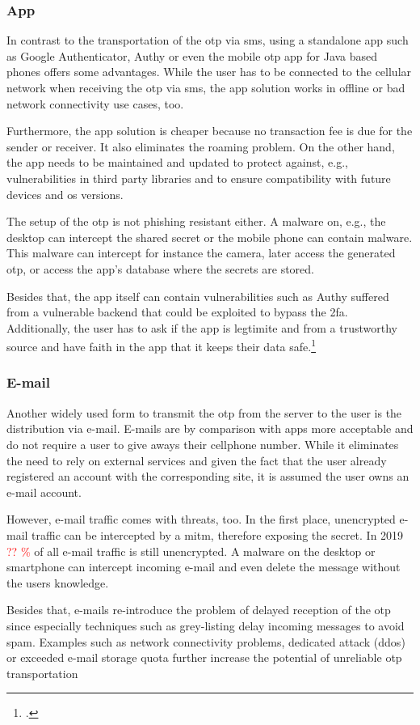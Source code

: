 
\subsubsection{App}
 
 In contrast to the transportation of the \gls{otp} via \gls{sms}, using a standalone app such as Google Authenticator, Authy or even the mobile \gls{otp} app for Java based phones offers some advantages. While the user has to be connected to the cellular network when receiving the \gls{otp} via \gls{sms}, the app solution works in offline or bad network connectivity use cases, too.
 
 Furthermore, the app solution is cheaper because no transaction fee is due for the sender or receiver. It also eliminates the roaming problem. On the other hand, the app needs to be maintained and updated to protect against, e.g., vulnerabilities in third party libraries and to ensure compatibility with future devices and \gls{os} versions.
 
 The setup of the \gls{otp} is not phishing resistant either. A malware on, e.g., the desktop can intercept the shared secret or the mobile phone can contain malware. This malware can intercept for instance the camera, later access the generated \gls{otp}, or access the app's database where the secrets are stored.
 
 Besides that, the app itself can contain vulnerabilities such as Authy suffered from a vulnerable backend that could be exploited to bypass the \gls{2fa}. Additionally, the user has to ask if the app is legtimite and from a trustworthy source and have faith in the app that it keeps their data safe.\footcites[See][]{eset-bypass2fa}[See][]{sakurity-authy}
 
\subsubsection{E-mail}

Another widely used form to transmit the \gls{otp} from the server to the user is the distribution via e-mail. E-mails are by comparison with apps more acceptable and do not require a user to give aways their cellphone number. While it eliminates the need to rely on external services and given the fact that the user already registered an account with the corresponding site, it is assumed the user owns an e-mail account.

However, e-mail traffic comes with threats, too. In the first place, unencrypted e-mail traffic can be intercepted by a \gls{mitm}, therefore exposing the secret. In 2019 \textcolor{red}{?? \%} of all e-mail traffic is still unencrypted. A malware on the desktop or smartphone can intercept incoming e-mail and even delete the message without the users knowledge.

Besides that, e-mails re-introduce the problem of delayed reception of the \gls{otp} since especially techniques such as grey-listing delay incoming messages to avoid spam. Examples such as network connectivity problems, dedicated attack (\gls{ddos}) or exceeded e-mail storage quota further increase the potential of unreliable \gls{otp} transportation